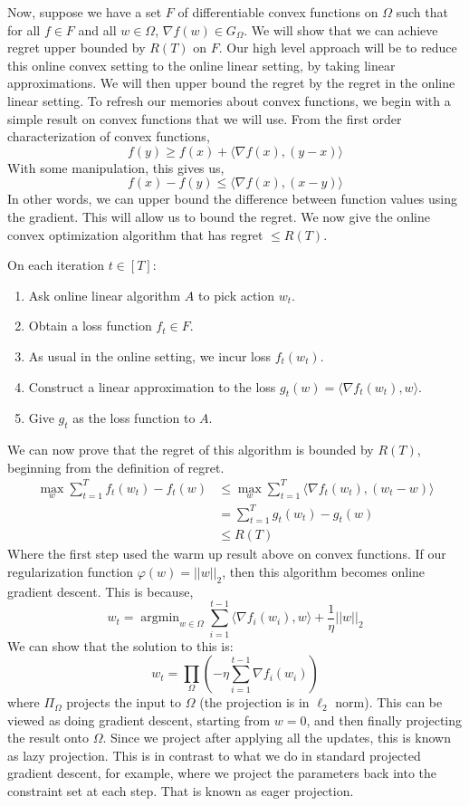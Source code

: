 \documentclass[11pt]{article}
\newcommand{\argmin}{\mathop{\text{argmin}}}
\begin{document}
Now, suppose we have a set $F$ of differentiable convex functions on $\Omega$ such that for all $f \in F$ and all $w \in \Omega$, $\nabla f(w) \in G_{\Omega}$. We will show that we can achieve regret upper bounded by $R(T)$ on $F$. Our high level approach will be to reduce this online convex setting to the online linear setting, by taking linear approximations. We will then upper bound the regret by the regret in the online linear setting. To refresh our memories about convex functions, we begin with a simple result on convex functions that we will use. From the first order characterization of convex functions,
\[ f(y) \geq f(x) + \langle \nabla f(x), (y - x) \rangle \]
With some manipulation, this gives us,
\[ f(x) - f(y) \leq \langle \nabla f(x), (x-y) \rangle \]
In other words, we can upper bound the difference between function values using the gradient. This will allow us to bound the regret. We now give the online convex optimization algorithm that has regret $\leq R(T)$.

On each iteration $t \in [T]$:
\begin{enumerate}
\item Ask online linear algorithm $A$ to pick action $w_t$.
\item Obtain a loss function $f_t \in F$.
\item As usual in the online setting, we incur loss $f_t(w_t)$.
\item Construct a linear approximation to the loss $g_t(w) = \langle \nabla f_t(w_t), w \rangle$.
\item Give $g_t$ as the loss function to $A$.
\end{enumerate}

We can now prove that the regret of this algorithm is bounded by $R(T)$, beginning from the definition of regret.
\begin{align*}
\max_w \sum_{t=1}^T f_t(w_t) - f_t(w) &\leq \max_w \sum_{t=1}^T \langle \nabla f_t(w_t), (w_t - w) \rangle \\
&= \sum_{t=1}^T g_t(w_t) - g_t(w) \\
&\leq R(T)
\end{align*}
Where the first step used the warm up result above on convex functions. If our regularization function $\varphi (w) = ||w||_2$, then this algorithm becomes online gradient descent. This is because,
\[ w_t = \argmin_{w \in \Omega} \sum_{i=1}^{t-1} \langle \nabla f_i(w_i), w \rangle + \frac{1}{\eta} ||w||_2 \]
We can show that the solution to this is:
\[ w_t = \prod_{\Omega}\left(-\eta \sum_{i=1}^{t-1} \nabla f_i(w_i)\right) \]
where $\Pi_{\Omega}$ projects the input to $\Omega$ (the projection is in $\ell_2$ norm). This can be viewed as doing gradient descent, starting from $w = 0$, and then finally projecting the result onto $\Omega$. Since we project after applying all the updates, this is known as lazy projection. This is in contrast to what we do in standard projected gradient descent, for example, where we project the parameters back into the constraint set at each step. That is known as eager projection.



\end{document}
